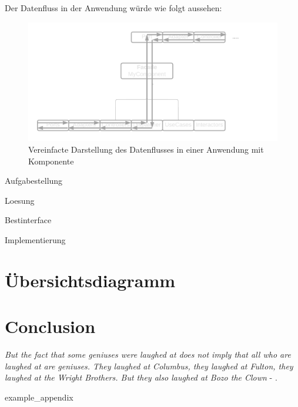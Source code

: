 \documentclass{article}
\begin{document}
    Der Datenfluss in der Anwendung würde wie folgt aussehen:
    \begin{figure}[H]
        \centering
        \includegraphics[width=1\textwidth]{./images/Dataflow as Component with inform.png}
        \caption{Vereinfacte Darstellung des Datenflusses in einer Anwendung mit Komponente}
        \label{fig:SimpliedDataflowWithComponent}
    \end{figure}

\newpage



{Aufgabestellung}

{Loesung}


\newpage
{Bestinterface}

\newpage
{Implementierung}

\section{Übersichtsdiagramm}

\section{Conclusion}
\textit{But the fact that some geniuses were laughed at does not imply that all who are laughed at are geniuses. They laughed at Columbus, they laughed at Fulton, they laughed at the Wright Brothers. But they also laughed at Bozo the Clown} -  \textcite{sagan_1993}.

\newpage
\printbibliography[heading = bibintoc, title = Bibliography]    %

\addappendix
{example_appendix}

\end{document}
